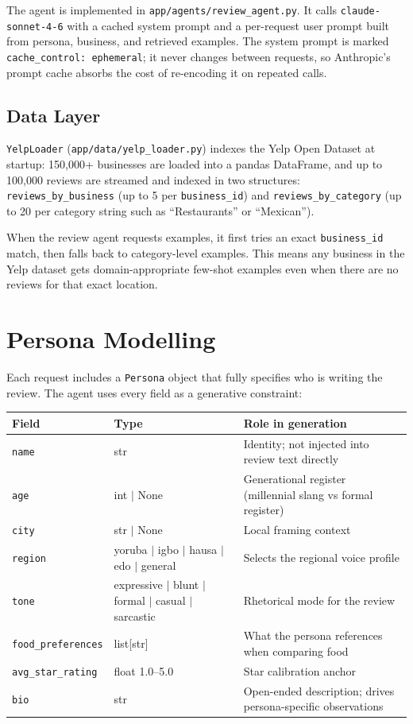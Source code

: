 \documentclass[11pt]{article}
\begin{document}
The agent is implemented in \texttt{app/agents/review\_agent.py}. It calls \texttt{claude-sonnet-4-6} with a cached system prompt and a per-request user prompt built from persona, business, and retrieved examples. The system prompt is marked \texttt{cache\_control: ephemeral}; it never changes between requests, so Anthropic's prompt cache absorbs the cost of re-encoding it on repeated calls.

\subsection{Data Layer}

\texttt{YelpLoader} (\texttt{app/data/yelp\_loader.py}) indexes the Yelp Open Dataset at startup: 150,000+ businesses are loaded into a pandas DataFrame, and up to 100,000 reviews are streamed and indexed in two structures: \texttt{reviews\_by\_business} (up to 5 per \texttt{business\_id}) and \texttt{reviews\_by\_category} (up to 20 per category string such as ``Restaurants'' or ``Mexican'').

When the review agent requests examples, it first tries an exact \texttt{business\_id} match, then falls back to category-level examples. This means any business in the Yelp dataset gets domain-appropriate few-shot examples even when there are no reviews for that exact location.

\section{Persona Modelling}

Each request includes a \texttt{Persona} object that fully specifies who is writing the review. The agent uses every field as a generative constraint:

\begin{table}[h]
\centering
\begin{tabularx}{\textwidth}{llX}
\toprule
\textbf{Field} & \textbf{Type} & \textbf{Role in generation} \\
\midrule
\texttt{name} & str & Identity; not injected into review text directly \\
\texttt{age} & int $|$ None & Generational register (millennial slang vs formal register) \\
\texttt{city} & str $|$ None & Local framing context \\
\texttt{region} & yoruba $|$ igbo $|$ hausa $|$ edo $|$ general & Selects the regional voice profile \\
\texttt{tone} & expressive $|$ blunt $|$ formal $|$ casual $|$ sarcastic & Rhetorical mode for the review \\
\texttt{food\_preferences} & list[str] & What the persona references when comparing food \\
\texttt{avg\_star\_rating} & float 1.0–5.0 & Star calibration anchor \\
\texttt{bio} & str & Open-ended description; drives persona-specific observations \\
\bottomrule
\end{tabularx}
\end{table}
\end{document}
